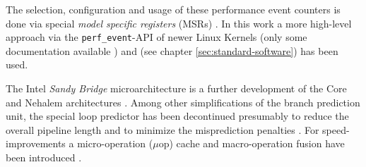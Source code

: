 The selection, configuration and usage of these performance event counters is
done via special \emph{model specific registers} (MSRs)
\cite{intel2011softdev3b}. In this work a more high-level approach via the
\texttt{perf\_event}-API of newer Linux Kernels (only some documentation
available \cite{weaver2011perfevents}) and \JWTlibpfm{} (see chapter
\ref{sec:standard-software}) has been used.



The Intel\TReg{} \emph{Sandy Bridge} microarchitecture is a further development
of the Core and Nehalem architectures \cite{fog11}. Among other simplifications
of the branch prediction unit, the special loop predictor has been decontinued
presumably to reduce the overall pipeline length and to minimize the
misprediction penalties \cite{fog11}. For speed-improvements a micro-operation
($\mu$op) cache and macro-operation fusion have been introduced \cite{fog11}.
